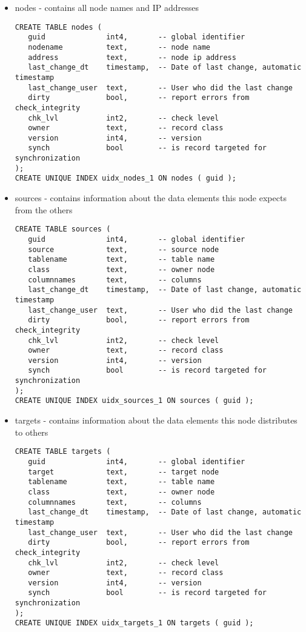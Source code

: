 \begin{itemize}
\item nodes - contains all node names and IP addresses
\begin{verbatim}
CREATE TABLE nodes (
   guid              int4,       -- global identifier
   nodename          text,       -- node name
   address           text,       -- node ip address
   last_change_dt    timestamp,  -- Date of last change, automatic timestamp
   last_change_user  text,       -- User who did the last change
   dirty             bool,       -- report errors from check_integrity
   chk_lvl           int2,       -- check level
   owner             text,       -- record class
   version           int4,       -- version
   synch             bool        -- is record targeted for synchronization
);
CREATE UNIQUE INDEX uidx_nodes_1 ON nodes ( guid );
\end{verbatim} 
\item sources - contains information about the data elements this node
expects from the others
\begin{verbatim}
CREATE TABLE sources (
   guid              int4,       -- global identifier
   source            text,       -- source node
   tablename         text,       -- table name
   class             text,       -- owner node
   columnnames       text,       -- columns
   last_change_dt    timestamp,  -- Date of last change, automatic timestamp
   last_change_user  text,       -- User who did the last change
   dirty             bool,       -- report errors from check_integrity
   chk_lvl           int2,       -- check level
   owner             text,       -- record class
   version           int4,       -- version
   synch             bool        -- is record targeted for synchronization
);
CREATE UNIQUE INDEX uidx_sources_1 ON sources ( guid );
\end{verbatim} 
\item targets - contains information about the data elements this node distributes
to others
\begin{verbatim}
CREATE TABLE targets (
   guid              int4,       -- global identifier
   target            text,       -- target node
   tablename         text,       -- table name
   class             text,       -- owner node
   columnnames       text,       -- columns
   last_change_dt    timestamp,  -- Date of last change, automatic timestamp
   last_change_user  text,       -- User who did the last change
   dirty             bool,       -- report errors from check_integrity
   chk_lvl           int2,       -- check level
   owner             text,       -- record class
   version           int4,       -- version
   synch             bool        -- is record targeted for synchronization
);
CREATE UNIQUE INDEX uidx_targets_1 ON targets ( guid );
\end{verbatim} 
\end{itemize}
